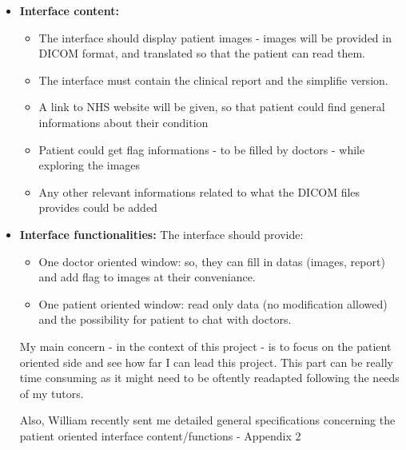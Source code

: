 \begin{itemize}	
\item \textbf{Interface content:}
\newline \vspace{5mm}

\begin{itemize}
\item The interface should display patient images - images will be provided in DICOM format, and translated so that the patient can read them.
\item The interface must contain the clinical report and the simplifie version.
\item A link to NHS website will be given, so that patient could find general informations about their condition
\item Patient could get flag informations - to be filled by doctors - while exploring the images
\item Any other relevant informations related to what the DICOM files provides could be added 
\end{itemize}

\newline \vspace{5mm}

\item \textbf{Interface functionalities:}
\newline \vspace{5mm}
The interface should provide:
\begin{itemize}
\item One doctor oriented window: so, they can fill in datas (images, report) and add flag to images at their conveniance.
\item One patient oriented window: read only data (no modification allowed) and the possibility for patient to chat with doctors.

\end{itemize}

My main concern - in the context of this project - is to focus on the patient oriented side and see how far I can lead this project. This part can be really time consuming as it might need to be oftently readapted following the needs of my tutors.

Also, William recently sent me detailed general specifications concerning the patient oriented interface content/functions - Appendix 2

\newline \vspace{5mm}


\end{itemize}
